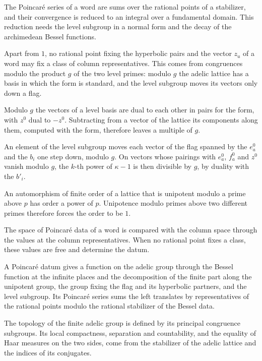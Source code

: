 The Poincaré series of a word are sums over the rational points of a
stabilizer, and their convergence is reduced to an integral over a fundamental
domain. This reduction needs the level subgroup in a normal form and the decay
of the archimedean Bessel functions.

Apart from $1$, no rational point fixing the hyperbolic pairs and the vector $z_u$ of a word may fix a
class of column representatives. This
comes from congruences modulo the product $g$ of the two level primes: modulo $g$ the adelic lattice
has a basis in which the form is standard, and the level subgroup moves its vectors only down a flag.

Modulo $g$ the vectors of a level basis are dual to each other in pairs for the form, with $z^0$ dual
to $-z^0$. Subtracting from a vector of the lattice its components along them, computed with the
form, therefore leaves a multiple of $g$.

An element of the level subgroup moves each vector of the flag spanned by the $e^0_a$ and the $b_i$
one step down, modulo $g$. On vectors whose pairings with $e^0_a$, $f^0_a$ and $z^0$ vanish modulo $g$,
the $k$-th power of $\kappa-1$ is then divisible by $g$, by duality with the $b'_i$.

An automorphism of finite order of a lattice that is unipotent modulo a prime above $p$ has order a
power of $p$. Unipotence modulo primes above two different primes therefore forces the order to be
$1$.

The space of Poincaré data of a word is compared with the column space through
the values at the column representatives. When no rational point fixes a
class, these values are free and determine the datum.

A Poincaré datum gives a function on the adelic group through the Bessel function at the infinite
places and the decomposition of the finite part along the unipotent group, the group fixing the flag
and its hyperbolic partners, and the level subgroup. Its Poincaré series sums the left translates by
representatives of the rational points modulo the rational stabilizer of the Bessel data.

The topology of the finite adelic group is defined by its principal congruence subgroups. Its local
compactness, separation and countability, and the equality of Haar measures on the two sides, come from
the stabilizer of the adelic lattice and the indices of its conjugates.

